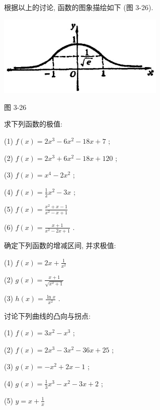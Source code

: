 \documentclass[lang=cn,newtx,10pt,scheme=chinese]{elegantbook}
\begin{document}
根据以上的讨论, 函数的图象描绘如下 (图 3-26).

\begin{center}
\includegraphics[max width=0.6\textwidth]{images/01912c18-5c3f-733d-b775-749ba9897a9d_174_141078.jpg}
\end{center}

图 3-26

\begin{problemset}[习 题 十 二]

\item 求下列函数的极值:

(1) \(f\left( x\right) = 2{x}^{3} - 6{x}^{2} - {18x} + 7\) ;

(2) \(f\left( x\right) = 2{x}^{3} + 6{x}^{2} - {18x} + {120}\) ;

(3) \(f\left( x\right) = {x}^{4} - 2{x}^{2}\) ;

(4) \(f\left( x\right) = \frac{1}{2}{x}^{2} - {3x}\) ;

(5) \(f\left( x\right) = \frac{{x}^{2} + x - 1}{{x}^{2} - x + 1}\)

(6) \(f\left( x\right) = \frac{x + 1}{{x}^{2} - {2x} + 1}\) .

\item 确定下列函数的增减区间, 并求极值:

(1) \(f\left( x\right) = {2x} + \frac{1}{{x}^{2}}\)

(2) \(g\left( x\right) = \frac{x + 1}{\sqrt{{x}^{2} + 1}}\)

(3) \(h\left( x\right) = \frac{\ln x}{{x}^{2}}\) .

\item 讨论下列曲线的凸向与拐点:

(1) \(f\left( x\right) = 3{x}^{2} - {x}^{3}\) ;

(2) \(f\left( x\right) = 2{x}^{3} - 3{x}^{2} - {36x} + {25}\) ;

(3) \(g\left( x\right) = - {x}^{2} + {2x} - 1\) ;

(4) \(g\left( x\right) = \frac{1}{3}{x}^{3} - {x}^{2} - {3x} + 2\) ;

(5) \(y = x + \frac{1}{x}\)


\end{problemset}
\end{document}
